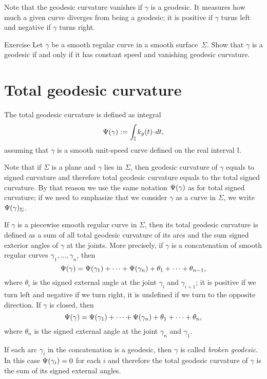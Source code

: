 Note that the geodesic curvature vanishes if $\gamma$ is a geodesic. 
It measures how much a given curve diverges from being a geodesic;
it is positive if $\gamma$ turns left and negative if $\gamma$ turns right.

\begin{thm}{Exercise}\label{ex:geodesic-curvature}
Let $\gamma$ be a smooth regular curve in a smooth surface~$\Sigma$.
Show that $\gamma$ is a geodesic if and only if it has constant speed and vanishing geodesic curvature.
\end{thm}

\section*{Total geodesic curvature}

The total geodesic curvature is defined as integral 
\[\tgc\gamma\df \int_{\mathbb{I}} k_g(t)\cdot dt,\]
assuming that $\gamma$ is a smooth unit-speed curve defined on the real interval $\mathbb{I}$.

Note that if $\Sigma$ is a plane and $\gamma$ lies in $\Sigma$, then geodesic curvature of $\gamma$ equals to signed curvature and therefore total geodesic curvature equals to the total signed curvature.
By that reason we use the same notation $\Psi({\gamma})$ as for total signed curvature; if we need to emphasize that we consider $\gamma$ as a curve in $\Sigma$, we write $\Psi({\gamma})_\Sigma$.

If $\gamma$ is a piecewise smooth regular curve in $\Sigma$, then
its total geodesic curvature is defined as a sum of all total geodesic curvature of its arcs and the sum signed exterior angles of $\gamma$ at the joints.
More precisely, if $\gamma$ is a concatenation of smooth regular curves $\gamma_1,\dots,\gamma_n$, then
\[\Psi({\gamma})=\Psi({\gamma_1})+\dots+\Psi({\gamma_n})+\theta_1+\dots+\theta_{n-1},\]
where $\theta_i$ is the signed external angle at the joint $\gamma_i$ and $\gamma_{i+1}$; it is positive if we turn left and negative if we turn right, it is undefined if we turn to the opposite direction.
If $\gamma$ is closed, then 
\[\Psi({\gamma})=\Psi({\gamma_1})+\dots+\Psi({\gamma_n})+\theta_1+\dots+\theta_{n},\]
where $\theta_n$ is the signed external angle at the joint $\gamma_n$ and $\gamma_1$.

If each arc $\gamma_i$ in the concatenation is a geodesic, then $\gamma$ is called \emph{broken geodesic}.
In this case $\Psi({\gamma_i})=0$ for each $i$ and therefore the total geodesic curvature of $\gamma$ is the sum of its signed external angles.

